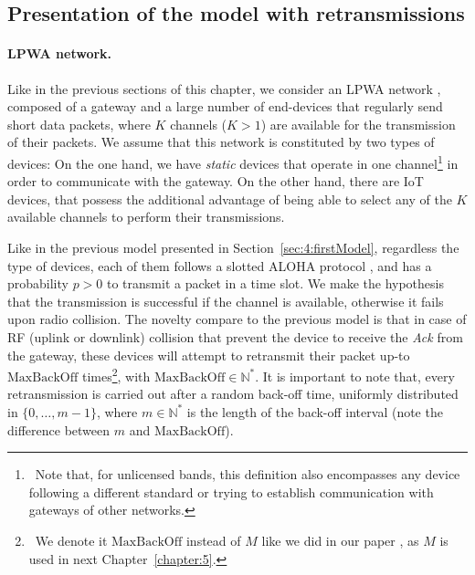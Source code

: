 \subsection{Presentation of the model with retransmissions}
\label{sub:43:model}

\paragraph{LPWA network.}

Like in the previous sections of this chapter, we consider an LPWA network \cite{Raza17}, composed of a gateway and a large number of end-devices that regularly send short data packets, where $K$ channels ($K>1$) are available for the transmission of their packets.
%
We assume that this network is constituted by two types of devices:
On the one hand, we have \emph{static} devices that operate in one channel\footnote{~Note that, for unlicensed bands, this definition also encompasses any device following a different standard or trying to establish communication with gateways of other networks.} in order to communicate with the gateway.
%
On the other hand, there are  IoT devices, that possess the additional advantage of being able to select any of the $K$ available channels to perform their transmissions.

Like in the previous model presented in Section~\ref{sec:4:firstModel},
regardless the type of devices, each of them follows a slotted ALOHA protocol \cite{Roberts75}, and has a probability $p>0$ to transmit a packet in a time slot.
We make the hypothesis that the transmission is successful if the channel is available, otherwise it fails upon radio collision.
The novelty compare to the previous model is that
in case of RF (uplink or downlink) collision that prevent the device to receive the \emph{Ack} from the gateway,
these devices will attempt to retransmit their packet up-to $\mathrm{MaxBackOff}$ times\footnote{~We denote it $\mathrm{MaxBackOff}$ instead of $M$ like we did in our paper \cite{Bonnefoi2019WCNC}, as $M$ is used in next Chapter~\ref{chapter:5}.},
with $\mathrm{MaxBackOff} \in\mathbb{N}^*$.
It is important to note that, every retransmission is carried out after a random back-off time, uniformly distributed in $\{0, \dots, m-1\}$, where $m \in\mathbb{N}^*$ is the length of the back-off interval
(note the difference between $m$ and $\mathrm{MaxBackOff}$).


